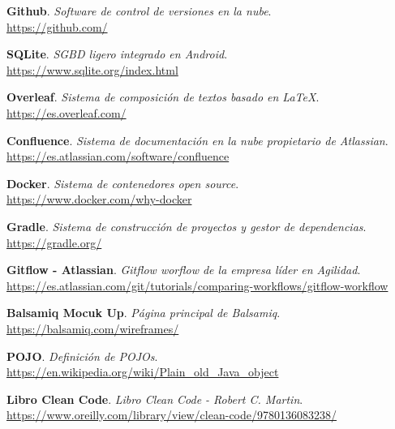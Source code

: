 \begin{thebibliography}{X}
\begin{multicols}{2}
    \textbf{Github}. \textit{Software de control de versiones en la nube}. \\
    \small{\url{https://github.com/}}
    
    \textbf{SQLite}. \textit{SGBD ligero integrado en Android}. \\
    \small{\url{https://www.sqlite.org/index.html}}
    
    \textbf{Overleaf}. \textit{Sistema de composición de textos basado en \LaTeX}. \\
    \small{\url{https://es.overleaf.com/}}
    
    \textbf{Confluence}. \textit{Sistema de documentación en la nube propietario de Atlassian}. \\
    \small{\url{https://es.atlassian.com/software/confluence}}
    
    \textbf{Docker}. \textit{Sistema de contenedores open source}. \\
    \small{\url{https://www.docker.com/why-docker}}
    
    \textbf{Gradle}. \textit{Sistema de construcción de proyectos y gestor de dependencias}. \\
    \small{\url{https://gradle.org/}}
    
    \textbf{Gitflow - Atlassian}. \textit{Gitflow worflow de la empresa líder en Agilidad}. \\
    \small{\url{https://es.atlassian.com/git/tutorials/comparing-workflows/gitflow-workflow}}
    
    \textbf{Balsamiq Mocuk Up}. \textit{Página principal de Balsamiq}. \\
    \small{\url{https://balsamiq.com/wireframes/}}
    
    \textbf{POJO}. \textit{Definición de POJOs}. \\
    \small{\url{https://en.wikipedia.org/wiki/Plain_old_Java_object}}

    \textbf{Libro Clean Code}. \textit{Libro Clean Code - Robert C. Martin}. \\
    \small{\url{https://www.oreilly.com/library/view/clean-code/9780136083238/}}

\end{multicols}
\end{thebibliography}